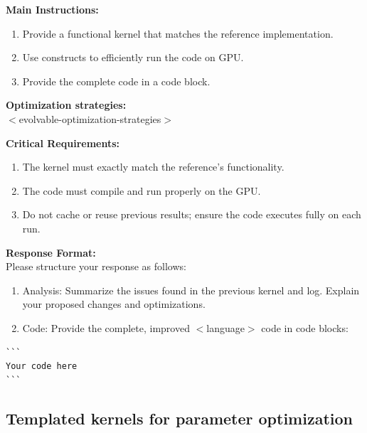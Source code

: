 \begin{promptbox}
\vspace{0.5em}

\textbf{Main Instructions:}
\vspace{-0.5em}
\begin{enumerate}\itemsep-0.5em
    \item Provide a functional kernel that matches the reference implementation.
    \item Use constructs to efficiently run the code on GPU.
    \item Provide the complete code in a code block.
\end{enumerate}

\textbf{Optimization strategies:}\\
$<$evolvable-optimization-strategies$>$

\vspace{0.5em}
    
\textbf{Critical Requirements:}
\vspace{-0.5em}
\begin{enumerate}\itemsep-0.3em
    \item The kernel must exactly match the reference's functionality.
    \item The code must compile and run properly on the GPU.
    \item Do not cache or reuse previous results; ensure the code executes fully on each run.
\end{enumerate}

\textbf{Response Format:}\\
Please structure your response as follows:
\vspace{-0.5em}
\begin{enumerate}\itemsep-0.3em
    \item Analysis: Summarize the issues found in the previous kernel and log. Explain your proposed changes and optimizations.
    \item Code: Provide the complete, improved $<$language$>$ code in code blocks:
\end{enumerate}
\vspace{-1em}
\begin{verbatim}
```
Your code here
```
\end{verbatim}
\end{promptbox}



\subsection{Templated kernels for parameter optimization}\label{app:templated_prompt}

